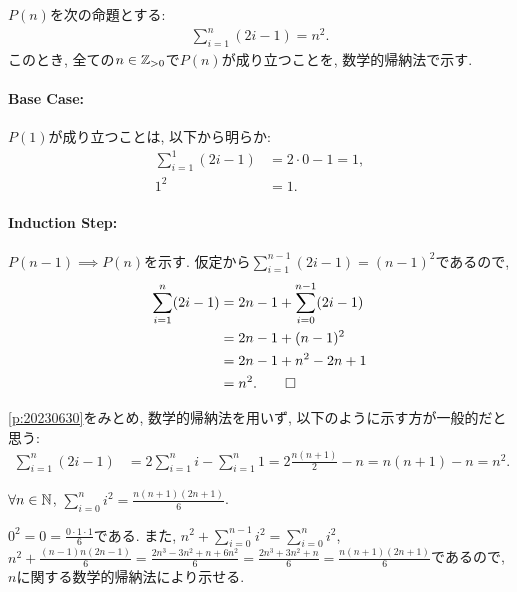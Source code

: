 \begin{proof*}
  $P(n)$を次の命題とする:
  \begin{align*}
    \sum_{i=1}^{n}(2i-1)=n^2.
  \end{align*}
  このとき,
  全ての$n\in\mathbb{Z}_{>0}$で$P(n)$が成り立つことを,
  数学的帰納法で示す.

  \paragraph{Base Case:}
  $P(1)$が成り立つことは, 以下から明らか:
  \begin{align*}
    \sum_{i=1}^{1}(2i-1)&=2\cdot 0-1=1,\\
    1^2&=1.
  \end{align*}

  \paragraph{Induction Step:}
  $P(n-1)\implies P(n)$を示す.
  仮定から$\sum_{i=1}^{n-1}(2i-1)=(n-1)^2$であるので,
  \begin{align*}
    \sum_{i=1}^{n}(2i-1)&=2n-1+\sum_{i=0}^{n-1}(2i-1)\\
    &=2n-1+(n-1)^2\\
    &=2n-1+n^2-2n+1\\
    &=n^2.
    \qedhere
  \end{align*}
\end{proof*}

\begin{rem}
  \cref{p:20230630}をみとめ,
  数学的帰納法を用いず, 以下のように示す方が一般的だと思う:
  \begin{align*}
    \sum_{i=1}^{n}(2i-1)&=
    2\sum_{i=1}^{n}i-\sum_{i=1}^n 1
    =2\frac{n(n+1)}{2}-n=n(n+1)-n=n^2.
  \end{align*}
\end{rem}

\begin{prop}
  \label{p:20230705}
  $\forall n\in\mathbb{N}$, $\sum_{i=0}^{n}i^2=\frac{n(n+1)(2n+1)}{6}$.
\end{prop}
\begin{proof**}
  $0^2=0=\frac{0\cdot 1\cdot 1}{6}$である.
  また,
  $n^2+\sum_{i=0}^{n-1}i^2=\sum_{i=0}^{n}i^2$,
  $n^2+\frac{(n-1)n(2n-1)}{6}=\frac{2n^3-3n^2+n+6n^2}{6}=\frac{2n^3+3n^2+n}{6}=\frac{n(n+1)(2n+1)}{6}$であるので,
  $n$に関する数学的帰納法により示せる.
\end{proof**}


